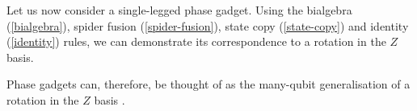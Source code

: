 
Let us now consider a single-legged phase gadget. Using the bialgebra (\ref{bialgebra}), spider fusion (\ref{spider-fusion}), state copy (\ref{state-copy}) and identity (\ref{identity}) rules, we can demonstrate its correspondence to a rotation in the $Z$ basis.

\label{phase-gadget-single-leg}

Phase gadgets can, therefore, be thought of as the many-qubit generalisation of a rotation in the $Z$ basis \cite{Yeung2020}. 

